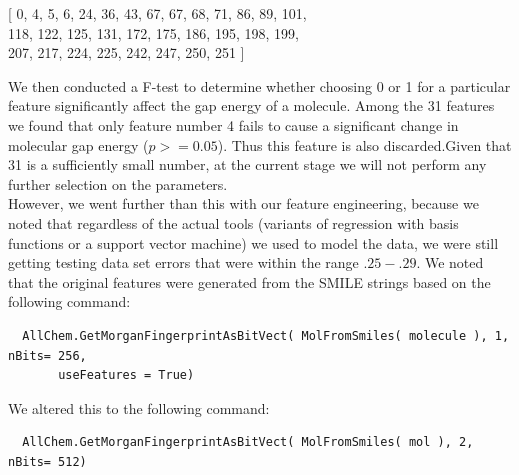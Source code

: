 \documentclass[11pt]{article}
\begin{document}
\begin{center}
[ 0, 4, 5, 6, 24, 36, 43, 67, 67, 68, 71, 86, 89, 101, \\
118, 122, 125, 131, 172, 175, 186, 195, 198, 199, \\ 207, 217, 224,
225, 242, 247, 250, 251 ]
\end{center}

We then conducted a F-test to determine whether choosing 0 or 1 for a particular feature significantly affect the gap energy of a molecule. Among the 31 features we found that only feature number 4 fails to cause a significant change in molecular gap energy ($p >= 0.05$). Thus this feature is also discarded.Given that 31 is a sufficiently small number, at the current stage we will not perform any further selection on the parameters.
\\

However, we went further than this with our feature engineering, because we noted that regardless of the actual tools (variants of regression with basis functions or a support vector machine) we used to model the data, we were still getting testing data set errors that were within the range $.25 - .29$. We noted that the original features were generated from the SMILE strings based on the following command:

 
 
\begin{lstlisting}
  AllChem.GetMorganFingerprintAsBitVect( MolFromSmiles( molecule ), 1, nBits= 256,
       useFeatures = True)
\end{lstlisting}
We altered this to the following command:


\begin{lstlisting}
  AllChem.GetMorganFingerprintAsBitVect( MolFromSmiles( mol ), 2, nBits= 512)
\end{lstlisting}
\end{document}
